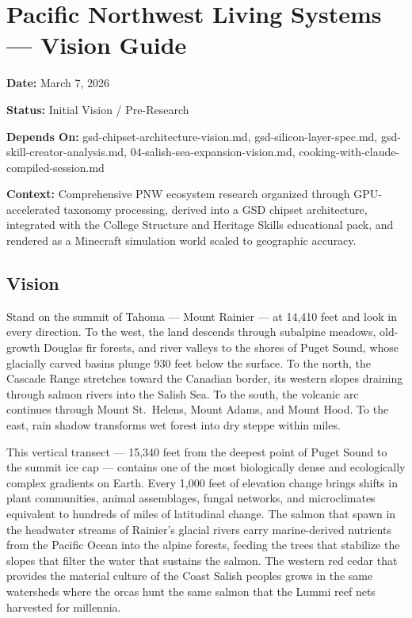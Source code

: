 \documentclass[11pt,letterpaper]{article}
\newcommand{\stageheader}[2]{%
  \noindent\colorbox{#2}{\makebox[\textwidth][l]{%
    \textcolor{white}{\bfseries\sffamily\hspace{6pt}#1\hspace{6pt}}}}%
  \vspace{0.5em}\par%
}
\newcommand{\metafield}[2]{\textbf{\sffamily #1} #2\par}
\begin{document}
\stageheader{STAGE 1 --- VISION DOCUMENT}{primary}

\section{Pacific Northwest Living Systems --- Vision Guide}

\metafield{Date:}{March 7, 2026}
\metafield{Status:}{Initial Vision / Pre-Research}
\metafield{Depends On:}{gsd-chipset-architecture-vision.md, gsd-silicon-layer-spec.md, gsd-skill-creator-analysis.md, 04-salish-sea-expansion-vision.md, cooking-with-claude-compiled-session.md}
\metafield{Context:}{Comprehensive PNW ecosystem research organized through GPU-accelerated taxonomy processing, derived into a GSD chipset architecture, integrated with the College Structure and Heritage Skills educational pack, and rendered as a Minecraft simulation world scaled to geographic accuracy.}

\subsection{Vision}

Stand on the summit of Tahoma --- Mount Rainier --- at 14,410 feet and look in every direction. To the west, the land descends through subalpine meadows, old-growth Douglas fir forests, and river valleys to the shores of Puget Sound, whose glacially carved basins plunge 930 feet below the surface. To the north, the Cascade Range stretches toward the Canadian border, its western slopes draining through salmon rivers into the Salish Sea. To the south, the volcanic arc continues through Mount St.\ Helens, Mount Adams, and Mount Hood. To the east, rain shadow transforms wet forest into dry steppe within miles.

This vertical transect --- 15,340 feet from the deepest point of Puget Sound to the summit ice cap --- contains one of the most biologically dense and ecologically complex gradients on Earth. Every 1,000 feet of elevation change brings shifts in plant communities, animal assemblages, fungal networks, and microclimates equivalent to hundreds of miles of latitudinal change. The salmon that spawn in the headwater streams of Rainier's glacial rivers carry marine-derived nutrients from the Pacific Ocean into the alpine forests, feeding the trees that stabilize the slopes that filter the water that sustains the salmon. The western red cedar that provides the material culture of the Coast Salish peoples grows in the same watersheds where the orcas hunt the same salmon that the Lummi reef nets harvested for millennia.
\end{document}
